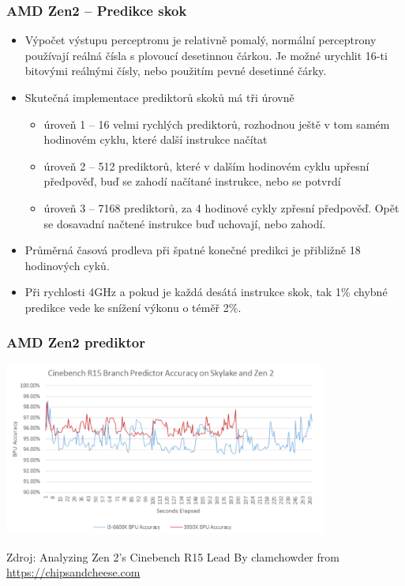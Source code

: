 \documentclass{beamer}
\begin{document}
\begin{frame}
\frametitle{AMD Zen2 -- Predikce skok}

\begin{itemize}
\item Výpočet výstupu perceptronu je relativně pomalý, normální perceptrony používají reálná čísla s plovoucí desetinnou čárkou. Je možné urychlit 16-ti bitovými reálnými čísly, nebo použitím pevné desetinné čárky.
\item Skutečná implementace prediktorů skoků má tři úrovně
\begin{itemize}
\item úroveň 1 -- 16 velmi rychlých prediktorů, rozhodnou ještě v tom samém hodinovém cyklu, které další instrukce načítat
\item úroveň 2 -- 512 prediktorů, které v dalším hodinovém cyklu upřesní předpověď, buď se zahodí načítané instrukce, nebo se potvrdí
\item úroveň 3 -- 7168 prediktorů, za 4 hodinové cykly zpřesní předpověď. Opět se dosavadní načtené instrukce buď uchovají, nebo zahodí.
\end{itemize}
\item Průměrná časová prodleva při špatné konečné predikci je přibližně 18 hodinových cyků.
\item Při rychlosti 4GHz a pokud je každá desátá instrukce skok, tak 1\% chybné predikce vede ke snížení výkonu o téměř 2\%.
\end{itemize}
\end{frame}


\begin{frame}
\frametitle{AMD Zen2 prediktor}

\begin{center}
\includegraphics[width=0.8\textwidth]{fig/amd_cinebench.png}
\end{center}

Zdroj: Analyzing Zen 2’s Cinebench R15 Lead
By clamchowder from \url{https://chipsandcheese.com}
\end{frame}
\end{document}
